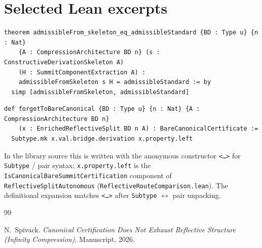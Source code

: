 \documentclass[11pt]{article}
\begin{document}
\section{Selected Lean excerpts}\label{app:lean-snippets}

\begin{lstlisting}[language=lean]
theorem admissibleFrom_skeleton_eq_admissibleStandard {BD : Type u} {n : Nat}
    {A : CompressionArchitecture BD n} (s : ConstructiveDerivationSkeleton A) 
    (H : SummitComponentExtraction A) :
    admissibleFromSkeleton s H = admissibleStandard := by
  simp [admissibleFromSkeleton, admissibleStandard]
\end{lstlisting}

\begin{lstlisting}[language=lean]
def forgetToBareCanonical {BD : Type u} {n : Nat} {A : CompressionArchitecture BD n}
    (x : EnrichedReflectiveSplit BD n A) : BareCanonicalCertificate :=
  Subtype.mk x.val.bridge.derivation x.property.left
\end{lstlisting}
\noindent In the library source this is written with the anonymous constructor \texttt{<\dots>} for \texttt{Subtype} / pair syntax; \texttt{x.property.left} is the \texttt{IsCanonicalBareSummitCertification} component of \texttt{ReflectiveSplitAutonomous} (\texttt{ReflectiveRouteComparison.lean}). The definitional expansion matches \texttt{<\dots>} after \texttt{Subtype} $\leftrightarrow$ pair unpacking.


\begin{thebibliography}{99}

N.~Spivack.
\newblock \emph{Canonical Certification Does Not Exhaust Reflective Structure (Infinity Compression)}.
\newblock Manuscript, 2026.

\end{thebibliography}
\end{document}
